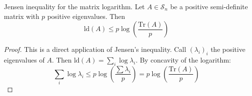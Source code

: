\begin{lemma} \label{lem:Jensen-inequality-matrix-logarithm-1}Jensen
inequality for the matrix logarithm. Let $A\in\mathcal{S}_{n}$ be
a positive semi-definite matrix with $p$ positive eigenvalues. Then
\[
\text{ld}\left(A\right)\leq p\log\left(\frac{\text{Tr}\left(A\right)}{p}\right)
\]
\end{lemma}

\begin{proof}This is a direct application of Jensen's inequality.
Call $\left(\lambda_{i}\right)_{i}$ the positive eigenvalues of $A$.
Then $\text{ld}\left(A\right)=\sum_{i}\log\lambda_{i}$. By concavity
of the logarithm:
\[
\sum_{i}\log\lambda_{i}\leq p\log\left(\frac{\sum\lambda_{i}}{p}\right)=p\log\left(\frac{\text{Tr}\left(A\right)}{p}\right)
\]


\end{proof}
